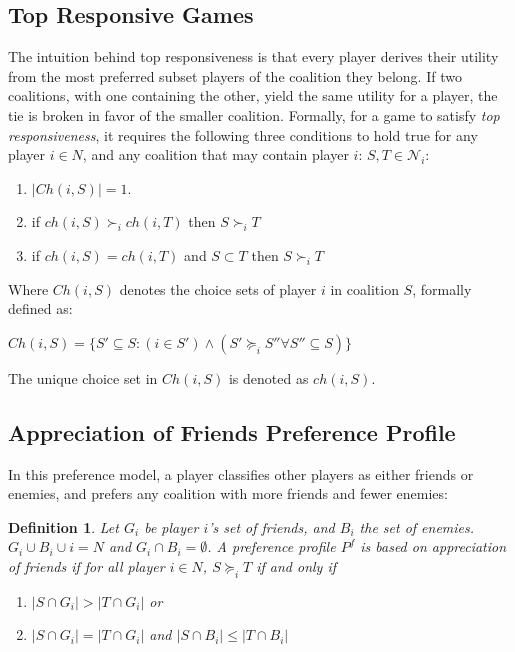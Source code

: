 \documentclass[letterpaper]{article} %
\newtheorem{definition}{Definition}
\begin{document}
\subsection{Top Responsive Games}
The intuition behind top responsiveness is that every player derives their utility from the most preferred subset players of the coalition they belong. If two coalitions, with one containing the other, yield the same utility for a player, the tie is broken in favor of the smaller coalition. Formally, for a game to satisfy {\it top responsiveness}, it requires the following three conditions to hold true for any player $i \in N$, and any coalition that may contain player $i$: $S, T \in \mathcal{N}_i$:
\begin{enumerate}
  \item $|Ch(i, S)| = 1$.
  \item if $ch(i, S) \succ_i ch(i, T)$ then $S \succ_i T$
  \item if $ch(i, S) = ch(i, T)$ and $S \subset T$ then $S \succ_i T$
\end{enumerate}

Where $Ch(i, S)$ denotes the choice sets of player $i$ in coalition $S$, formally defined as:

$Ch(i, S) = \{S' \subseteq S: (i \in S') \wedge (S' \succeq_i S'' \forall S'' \subseteq S)\}$

The unique choice set in $Ch(i, S)$ is denoted as $ch(i, S)$.

\subsection{Appreciation of Friends Preference Profile}

In this preference model, a player classifies other players as either friends or enemies, and prefers any coalition with more friends and fewer enemies:

\begin{definition}
  Let $G_i$ be player $i$'s set of friends, and $B_i$ the set of enemies. $G_i \cup B_i \cup i = N$ and $G_i \cap B_i = \emptyset$. A preference profile $P^f$ is based on {\it appreciation of friends} if for all player $i \in N$, $S \succeq_i T$ if and only if

\begin{enumerate}
  \item $|S \cap G_i| > |T \cap G_i|$ or
  \item $|S \cap G_i| = |T \cap G_i|$ and $|S \cap B_i| \leq |T \cap B_i|$
\end{enumerate}
\end{definition}
\end{document}
